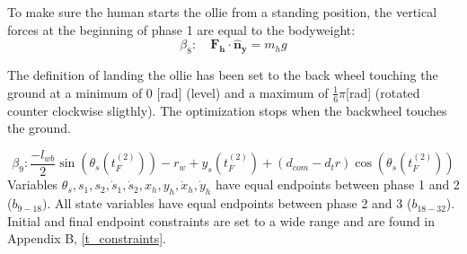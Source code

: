 To make sure the human starts the ollie from a standing position, the vertical forces at the beginning of phase 1 are equal to the bodyweight:
\begin{equation}
    \beta_8: \quad \mathbf{F_h} \cdot \mathbf{\hat n_y} = m_h g
\end{equation}

The definition of landing the ollie has been set to the back wheel touching the ground at a minimum of 0 [rad] (level) and a maximum of $\frac{1}{6} \pi$[rad] (rotated counter clockwise sligthly). The optimization stops when the backwheel touches the ground.

\begin{equation}
    \beta_9 : \frac{-l_{wb}}{2} \sin(\theta_s(t_F^{(2)})) - r_w + y_s(t_F^{(2)}) + (d_{com} - {d_tr}) \cos(\theta_s(t_F^{(2)}))
\end{equation}
Variables $\theta_s, s_1, s_2, \dot s_1, \dot s_2, x_h, y_h, \dot x_h, \dot y_h$ have equal endpoints between phase 1 and 2 ($b_{9-18})$. All state variables have equal endpoints between phase 2 and 3 ($b_{18-32}$). Initial and final endpoint constraints are set to a wide range and are found in Appendix B, \ref{t_constraints}.
